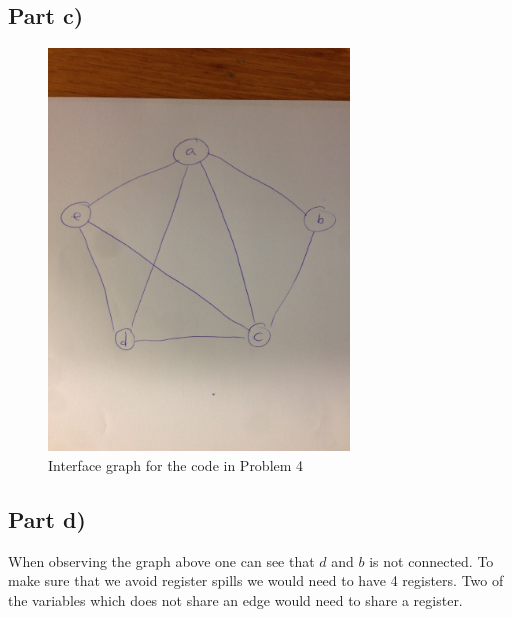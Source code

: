 \documentclass[paper=a4, fontsize=11pt]{scrartcl} %
\numberwithin{equation}{section} %
\numberwithin{figure}{section} %
\numberwithin{table}{section} %
\begin{document}
\subsection{Part c)}
\begin{figure}[ht!]
\centering
\includegraphics[width=80mm]{4c.jpg}
\caption{Interface graph for the code in Problem 4}
\label{fig:2c}
\end{figure}

\subsection{Part d)}
When observing the graph above one can see that $d$ and $b$ is not connected.
To make sure that we avoid register spills we would need to have 4 registers.
Two of the variables which does not share an edge would need to share a register.

\end{document}
